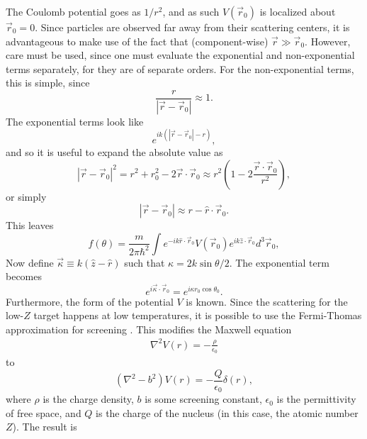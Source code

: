 The Coulomb potential goes as $1/r^2$, and as such $V(\vec{r}_0)$ is localized about $\vec{r}_0=0$. Since particles are observed far away from their scattering centers, it is advantageous to make use of the fact that (component-wise) $\vec{r} \gg \vec{r}_0$. However, care must be used, since one must evaluate the exponential and non-exponential terms separately, for they are of separate orders. For the non-exponential terms, this is simple, since
%
\begin{equation}\nonumber
\frac{r}{|\vec{r}-\vec{r}_0|}\approx1.
\end{equation}
%
The exponential terms look like
%
\begin{equation}\nonumber
e^{ik(|\vec{r}-\vec{r}_0|-r)},
\end{equation}
and so it is useful to expand the absolute value as
\begin{equation}\nonumber
|\vec{r}-\vec{r}_0|^2=r^2+r_0^2-2\vec{r}\cdot\vec{r}_0\approx r^2\left(1-2\frac{\vec{r}\cdot\vec{r}_0}{r^2}\right),
\end{equation}
%
or simply
%
\begin{equation} \nonumber |\vec{r}-\vec{r}_0|\approx r-\hat{r}\cdot\vec{r}_0. \end{equation}
%
This leaves
%
\begin{equation} \label{eqn:generalscattering}
f(\theta)=\frac{m}{2\pi\hbar^2}\int
e^{-ik\hat{r}\cdot\vec{r}_0}
V(\vec{r}_0)
e^{ik\hat{z}\cdot\vec{r}_0}
d^3\vec{r}_0,
\end{equation}
%
Now define $\vec{\kappa}\equiv k(\hat{z}-\hat{r})$ such that $\kappa=2k\sin{\theta/2}$. The exponential term becomes
%
\begin{equation} \nonumber
e^{i\vec{\kappa}\cdot\vec{r}_0}=e^{i\kappa r_0\cos{\theta_0}}.
\end{equation}
Furthermore, the form of the potential $V$ is known. Since the scattering for the low-$Z$ target happens at low temperatures, it is possible to use the Fermi-Thomas approximation for screening \cite{ashcroft}. This modifies the Maxwell equation 
\begin{align*}
\nabla^2 V(r) = -\frac{\rho}{\epsilon_0}
\end{align*}
to
\begin{equation} \nonumber
(\nabla^2-b^2)V(r)=-\frac{Q}{\epsilon_0}\delta(r),
\end{equation}
%
where $\rho$ is the charge density, $b$ is some screening constant, $\epsilon_0$ is the permittivity of free space, and $Q$ is the charge of the nucleus (in this case, the atomic number $Z$). The result is
